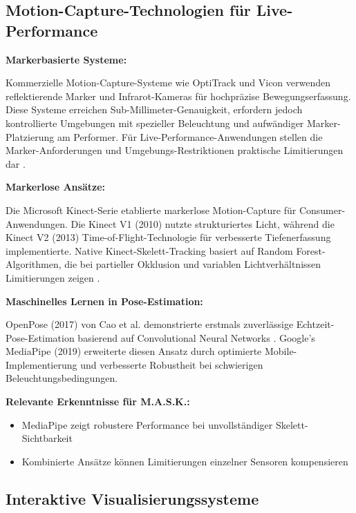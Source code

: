
\subsection{Motion-Capture-Technologien für Live-Performance}

\textbf{Markerbasierte Systeme:}

\raggedright Kommerzielle Motion-Capture-Systeme wie OptiTrack und Vicon verwenden reflektierende Marker und Infrarot-Kameras für hochpräzise Bewegungserfassung. Diese Systeme erreichen Sub-Millimeter-Genauigkeit, erfordern jedoch kontrollierte Umgebungen mit spezieller Beleuchtung und aufwändiger Marker-Platzierung am Performer. Für Live-Performance-Anwendungen stellen die Marker-Anforderungen und Umgebungs-Restriktionen praktische Limitierungen dar \cite{kitagawa2017mocap}.

\textbf{Markerlose Ansätze:}

\raggedright Die Microsoft Kinect-Serie etablierte markerlose Motion-Capture für Consumer-Anwendungen. Die Kinect V1 (2010) nutzte strukturiertes Licht, während die Kinect V2 (2013) Time-of-Flight-Technologie für verbesserte Tiefenerfassung implementierte. Native Kinect-Skelett-Tracking basiert auf Random Forest-Algorithmen, die bei partieller Okklusion und variablen Lichtverhältnissen Limitierungen zeigen \cite{shotton2011real}.

\textbf{Maschinelles Lernen in Pose-Estimation:}

\raggedright OpenPose (2017) von Cao et al. demonstrierte erstmals zuverlässige Echtzeit-Pose-Estimation basierend auf Convolutional Neural Networks \cite{cao2017realtime}. Google's MediaPipe (2019) erweiterte diesen Ansatz durch optimierte Mobile-Implementierung und verbesserte Robustheit bei schwierigen Beleuchtungsbedingungen.

\textbf{Relevante Erkenntnisse für M.A.S.K.:}
\begin{itemize}
    \item MediaPipe zeigt robustere Performance bei unvollständiger Skelett-Sichtbarkeit
    \item Kombinierte Ansätze können Limitierungen einzelner Sensoren kompensieren
\end{itemize}

\subsection{Interaktive Visualisierungssysteme}

